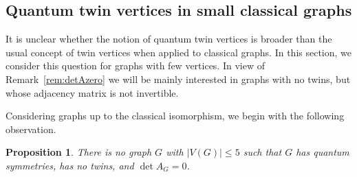 \documentclass[11pt,reqno]{amsart}
\newtheorem{proposition}{Proposition}[section]
\begin{document}
\subsection{Quantum twin vertices in small classical graphs}\label{subsec:small}\hspace*{\fill}

It is unclear whether the notion of quantum twin vertices is broader than the usual concept of twin vertices when applied to classical graphs. In this section, we consider this question for graphs with few vertices. In view of Remark~\ref{rem:detAzero} we will be mainly interested in graphs with no twins, but whose adjacency matrix is not invertible.

Considering graphs up to the classical isomorphism, we begin with the following observation.

\begin{proposition}
There is no graph $G$ with $|V(G)|\leq 5$ such that $G$ has quantum symmetries, has no twins, and $\det A_{\scriptscriptstyle G}=0$.
\end{proposition}
\end{document}
